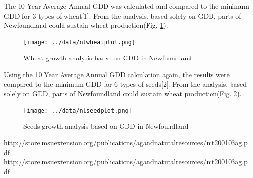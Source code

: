 \documentclass{article}
\begin{document}
\begin{enumerate}
The 10 Year Average Annual GDD was calculated and compared to the minimum GDD for 3 types of wheat[1]. From the analysis, based solely on GDD, parts of Newfoundland could sustain wheat production(Fig. \ref{wheat}).

 \begin{center}
 \begin{figure}[H]
 \centering
 \texttt{[image: ../data/nlwheatplot.png]}
 \caption{Wheat growth analysis based on GDD in Newfoundland }
 \label{wheat}
 \end{figure}
 \end{center}
 
 Using the 10 Year Average Annual GDD calculation again, the results were compared to the minimum GDD for 6 types of seeds[2]. From the analysis, based solely on GDD, parts of Newfoundland could sustain wheat production(Fig. \ref{seeds}).
 

\begin{center}
\begin{figure}[H]
\centering
\texttt{[image: ../data/nlseedplot.png]}

\caption{Seeds growth analysis based on GDD in Newfoundland}
\label{seeds}
\end{figure}
\end{center}


\end{enumerate}

\begin{thebibliography}{99}
	http://store.msuextension.org/publications/agandnaturalresources/mt200103ag.pdf
	http://store.msuextension.org/publications/agandnaturalresources/mt200103ag.pdf
\end{thebibliography}
	
 
\end{document}

